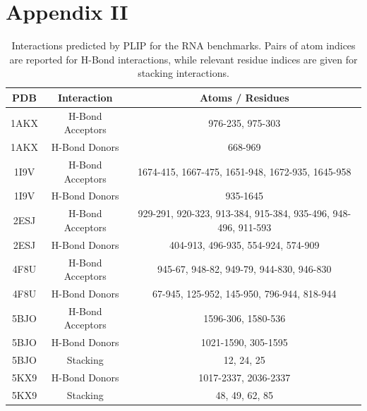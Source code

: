 \chapter{Appendix II}

\begin{table}[H]
  \caption{\label{tab:appx2/plip} Interactions predicted by PLIP for the RNA benchmarks. Pairs of atom indices are reported for H-Bond interactions, while relevant residue indices are given for stacking interactions.}
  \centering
  \begin{tabular}{ccc}
    \hline
    PDB  & Interaction      & Atoms / Residues                                              \\ \hline
    1AKX & H-Bond Acceptors & 976-235, 975-303                                              \\
    1AKX & H-Bond Donors    & 668-969                                                       \\
    1I9V & H-Bond Acceptors & 1674-415, 1667-475, 1651-948, 1672-935, 1645-958              \\
    1I9V & H-Bond Donors    & 935-1645                                                      \\
    2ESJ & H-Bond Acceptors & 929-291, 920-323, 913-384, 915-384, 935-496, 948-496, 911-593 \\
    2ESJ & H-Bond Donors    & 404-913, 496-935, 554-924, 574-909                            \\
    4F8U & H-Bond Acceptors & 945-67, 948-82, 949-79, 944-830, 946-830                      \\
    4F8U & H-Bond Donors    & 67-945, 125-952, 145-950, 796-944, 818-944                    \\
    5BJO & H-Bond Acceptors & 1596-306, 1580-536                                            \\
    5BJO & H-Bond Donors    & 1021-1590, 305-1595                                           \\
    5BJO & Stacking         & 12, 24, 25                                                    \\
    5KX9 & H-Bond Donors    & 1017-2337, 2036-2337                                          \\
    5KX9 & Stacking         & 48, 49, 62, 85                                                \\

\end{tabular}
\end{table}
